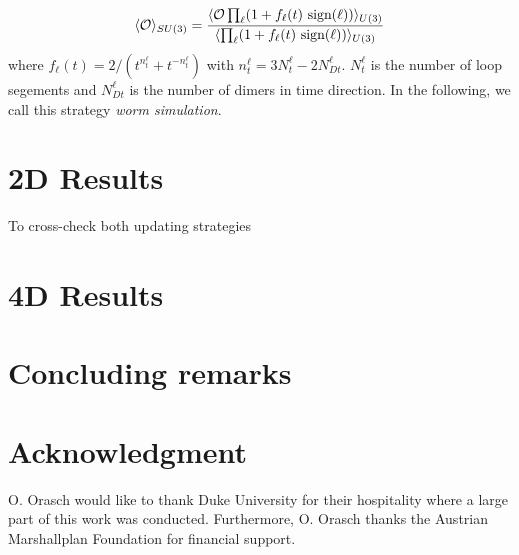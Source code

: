 \documentclass{PoS}
\begin{document}
\begin{equation}
\langle \mathcal{O} \rangle_{\tiny SU(3)} = \frac{\langle \mathcal{O} \prod_{\ell}(1 + f_{\ell}(t)\text{ sign}(\ell)) \rangle_{\tiny U(3)}}{\langle \prod_{\ell}(1 + f_{\ell}(t)\text{ sign}(\ell)) \rangle_{\tiny U(3)}}
\end{equation}
where $f_{\ell}(t) = 2/(t^{n^{\ell}_t} + t^{-n^{\ell}_t})$ with $n^{\ell}_t = 3N^{\ell}_t - 2N^{\ell}_{Dt}$. $N^{\ell}_t$ is the number of loop segements and $N^{\ell}_{Dt}$ is the number of dimers in time direction. In the following, we call this strategy \textit{worm simulation}.

\section{2D Results}

To cross-check both updating strategies

\newpage

\section{4D Results}

\newpage


\section{Concluding remarks}

\section{Acknowledgment}
O. Orasch would like to thank Duke University for their hospitality where a large part of this work was conducted. Furthermore, O. Orasch thanks the Austrian Marshallplan Foundation for financial support.
 
\end{document}

